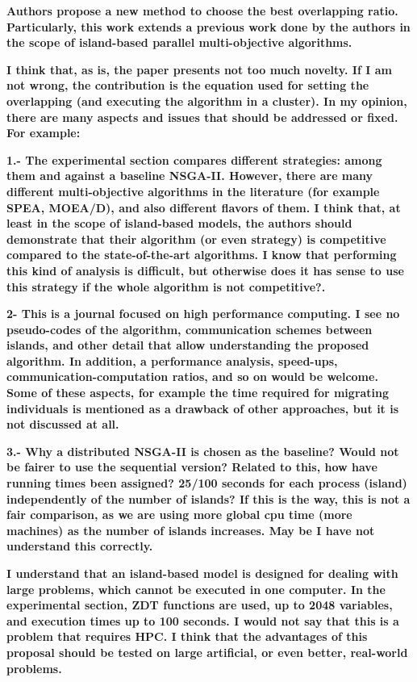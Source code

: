 \documentclass{article}
\begin{document}
\textbf{Authors propose a new method to choose the best overlapping ratio. Particularly, this work extends a previous work done by the authors in the scope of island-based parallel multi-objective algorithms.}

\textbf{I think that, as is, the paper presents not too much novelty. If I am not wrong, the contribution is the equation used for setting the overlapping (and executing the algorithm in a cluster). In my opinion, there are many aspects and issues that should be addressed or fixed. For example:}

\textbf{ 1.- The experimental section compares different strategies: among them and against a baseline NSGA-II. However, there are many different multi-objective algorithms in the literature (for example SPEA, MOEA/D), and also different flavors of them. I think that, at least in the scope of island-based models, the authors should demonstrate that their algorithm (or even strategy) is competitive compared to the state-of-the-art algorithms. I know that performing this kind of analysis is difficult, but otherwise does it has sense to use this strategy if the whole algorithm is not competitive?.}

\textbf{ 2- This is a journal focused on high performance computing. I see no pseudo-codes of the algorithm, communication schemes between islands, and other detail that allow understanding the proposed algorithm. In addition, a performance analysis, speed-ups, communication-computation ratios, and so on would be welcome. Some of these aspects, for example the time required for migrating individuals is mentioned as a drawback of other approaches, but it is not discussed at all.}

\textbf{ 3.- Why a distributed NSGA-II is chosen as the baseline? Would not be fairer to use the sequential version? Related to this, how have running times been assigned? 25/100 seconds for each process (island) independently of the number of islands? If this is the way, this is not a fair comparison, as we are using more global cpu time (more machines) as the number of islands increases. May be I have not understand this correctly.}

\textbf{ I understand that an island-based model is designed for dealing with large problems, which cannot be executed in one computer. In the experimental section, ZDT functions are used, up to 2048 variables, and execution times up to 100 seconds. I would not say that this is a problem that requires HPC. I think that the advantages of this proposal should be tested on large artificial, or even better, real-world problems.}
\end{document}
